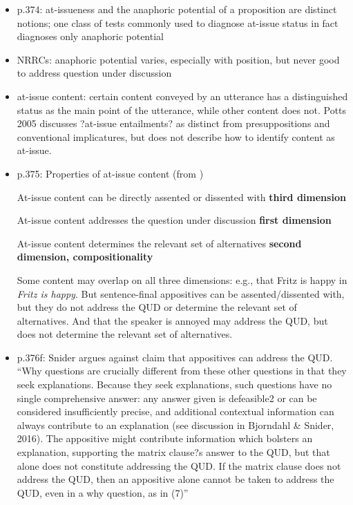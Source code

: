 \documentclass[11pt,fleqn]{article}
\newcommand{\6}{\mbox{$[\hspace*{-.6mm}[$}}
\newcommand{\9}{\mbox{$]\hspace*{-.6mm}]$}}
\begin{document}
\begin{itemize}
\begin{itemize}
\item p.374: at-issueness and the anaphoric potential of a proposition are distinct notions; one class of tests commonly used to diagnose at-issue status in fact diagnoses only anaphoric potential

\item NRRCs: anaphoric potential varies, especially with position, but never good to address question under discussion

\item at-issue content: certain content conveyed by an utterance has a distinguished status as the main point of the utterance, while other content does not. Potts 2005 discusses ?at-issue entailments? as distinct from presuppositions and conventional implicatures, but does not describe how to identify content as at-issue.

\item p.375: Properties of at-issue content (from \citealt{tonhauser-sula6})

At-issue content can be directly assented or dissented with {\bf third dimension}

At-issue content addresses the question under discussion {\bf first dimension}

At-issue content determines the relevant set of alternatives {\bf second dimension, compositionality}

Some content may overlap on all three dimensions: e.g., that Fritz is happy in {\em Fritz is happy}. But sentence-final appositives can be assented/dissented with, but they do not address the QUD or determine the relevant set of alternatives. And that the speaker is annoyed may address the QUD, but does not determine the relevant set of alternatives. 

\item p.376f: Snider argues against \citealt{syrett-koev2015} claim that appositives can address the QUD. ``Why questions are crucially different from these other questions in that they seek explanations. Because they seek explanations, such questions have no single comprehensive answer: any answer given is defeasible2 or can be considered insufficiently precise, and additional contextual information can always contribute to an explanation (see discussion in Bjorndahl \& Snider, 2016). The appositive might contribute information which bolsters an explanation, supporting the matrix clause?s answer to the QUD, but that alone does not constitute addressing the QUD. If the matrix clause does not address the QUD, then an appositive alone cannot be taken to address the QUD, even in a why question, as in (7)''


\end{itemize}
\end{itemize}
\end{document}
